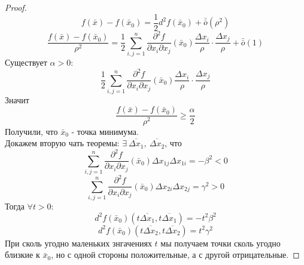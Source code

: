 \begin{proof}
    \[f(\bar{x})-f(\bar{x}_0)=\frac{1}{2}d^2f(\bar{x}_0)+\bar{\bar{o}}{(\rho^2)}\]
    \[\frac{f(\bar{x})-f(\bar{x}_0)}{\rho^2}=\frac{1}{2}\sum\limits_{i,j=1}^{n}\frac{\partial^2 {f}}{\partial {x_i} \partial x_j}(\bar{x}_0)\frac{\Delta x_i}{\rho}\cdot \frac{\Delta x_j}{\rho}+\bar{\bar{o}}{(1)}\]
    Существует $\alpha>0$: 
    \[\frac{1}{2}\sum\limits_{i,j=1}^{n}\frac{\partial^2 {f}}{\partial {x_i}\partial x_j}(\bar{x}_0) \frac{\Delta x_i}{\rho}\cdot \frac{\Delta x_j}{\rho}\]
    Значит
    \[\frac{f(\bar{x})-f(\bar{x}_0)}{\rho^2}\geq \frac{\alpha}{2}\]
    Получили, что $\bar{x}_0$ - точка минимума.\\
    Докажем вторую чать теоремы: $\exists\ \overline{\Delta x_1},\ \overline{\Delta x_2}$, что
    \[\sum\limits_{i,j=1}^{n}\frac{\partial^2 {f}}{\partial {x_i} \partial x_j}(\bar{x}_0)\Delta x_{1j}\Delta x_{1i}=-\beta^2<0\]
    \[\sum\limits_{i,j=1}^{n}\frac{\partial^2 {f}}{\partial {x_i} \partial x_j}(\bar{x}_0)\Delta x_{2i}\Delta x_{2j}=\gamma^2>0\]
    Тогда $\forall t>0$:
    \[d^2f(\bar{x}_0)(t \overline{\Delta x_1}, t\overline{\Delta x_1})=-t^2\beta^2\]
    \[d^2f(\bar{x}_0)(t \overline{\Delta x_2}, t\overline{\Delta x_2})=t^2\gamma^2\]
    При сколь угодно маленьких знгачениях $t$ мы получаем точки сколь угодно близкие к $\bar{x}_0$, но с одной стороны положительные, а с другой отрицательные.
\end{proof} 
